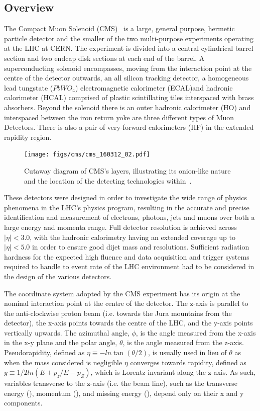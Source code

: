 \subsection{Overview}
The Compact Muon Solenoid (CMS)~\cite{oldcms} is a large, general purpose, hermetic particle detector and the smaller of the two multi-purpose experiments operating at the LHC at CERN.
The experiment is divided into a central cylindrical barrel section and two endcap disk sections at each end of the barrel.
A superconducting solenoid encompasses, moving from the interaction point at the centre of the detector outwards, an all silicon tracking detector, a homogeneous lead tungstate ($PbWO_{4}$) electromagnetic calorimeter (ECAL)and hadronic calorimeter (HCAL) comprised of plastic scintillating tiles interspaced with brass absorbers.
Beyond the solenoid there is an outer hadronic calorimeter (HO) and interspaced between the iron return yoke are three different types of Muon Detectors.
There is also a pair of very-forward calorimeters (HF) in the extended rapidity region.

\begin{figure}[htbp]
\begin{center}
\texttt{[image: figs/cms/cms\_160312\_02.pdf]}
\caption{Cutaway diagram of CMS’s layers, illustrating its onion-like nature and the location of the detecting technologies within~\cite{Sakuma:2013jqa}.}
\label{fig:cms-cutaway}
\end{center}
\end{figure}

These detectors were designed in order to investigate the wide range of physics phenomena in the LHC's physics program, resulting in the accurate and precise identification and measurement of electrons, photons, jets and muons over both a large energy and momenta range.
Full detector resolution is achieved across $|\eta| < 3.0$, with the hadronic calorimetry having an extended coverage up to $|\eta| < 5.0$ in order to ensure good dijet mass and \MET resolutions.
Sufficient radiation hardness for the expected high fluence and data acquisition and trigger systems required to handle to event rate of the LHC environment had to be considered in the design of the various detectors.

The coordinate system adopted by the CMS experiment has its origin at the nominal interaction point at the centre of the detector. 
The z-axis is parallel to the anti-clockwise proton beam (i.e. towards the Jura mountains from the detector), the x-axis points towards the centre of the LHC, and the y-axis points vertically upwards.
The azimuthal angle, $\phi$, is the angle measured from the x-axis in the x-y plane and the polar angle, $\theta$, is the angle measured from the z-axis.
Pseudorapidity, defined as $\eta \equiv -ln\tan(\theta/2)$, is usually used in lieu of $\theta$ as when the mass considered is negligible $\eta$ converges towards rapidity, defined as $y \equiv 1/2 ln(E+p_{z}/E-p_{Z})$, which is Lorentz invariant along the z-axis.
As such, variables transverse to the z-axis (i.e. the beam line), such as the transverse energy (\ET), momentum (\pT), and missing energy (\MET), depend only on their x and y components.


